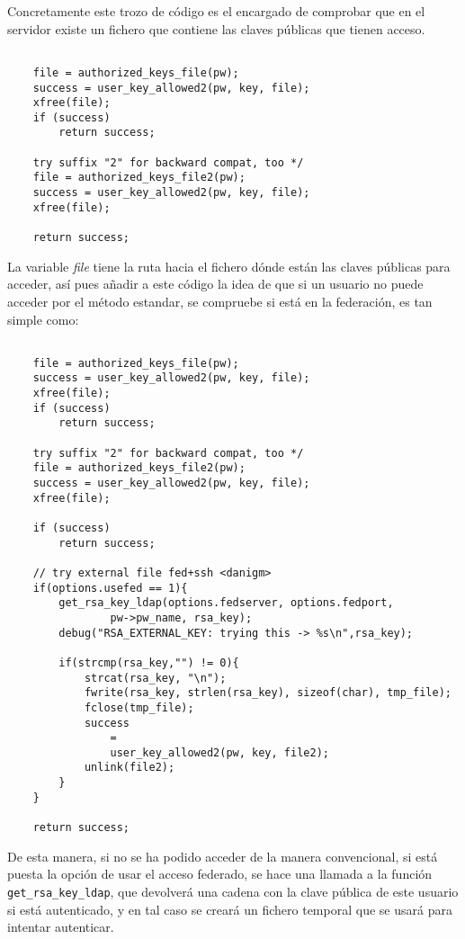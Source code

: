     Concretamente este trozo de código es el encargado de comprobar que
    en el servidor existe un fichero que contiene las claves públicas que
    tienen acceso.

    \begin{lstlisting}

    file = authorized_keys_file(pw);
    success = user_key_allowed2(pw, key, file);
    xfree(file);
    if (success)
        return success;

    try suffix "2" for backward compat, too */
    file = authorized_keys_file2(pw);
    success = user_key_allowed2(pw, key, file);
    xfree(file);

    return success;

    \end{lstlisting}

    La variable \textit{file} tiene la ruta hacia el fichero dónde están las claves
    públicas para acceder, así pues añadir a este código la idea de que si
    un usuario no puede acceder por el método estandar, se compruebe si
    está en la federación, es tan simple como:


    \begin{lstlisting}

    file = authorized_keys_file(pw);
    success = user_key_allowed2(pw, key, file);
    xfree(file);
    if (success)
        return success;

    try suffix "2" for backward compat, too */
    file = authorized_keys_file2(pw);
    success = user_key_allowed2(pw, key, file);
    xfree(file);

    if (success)
        return success;

    // try external file fed+ssh <danigm>
    if(options.usefed == 1){
        get_rsa_key_ldap(options.fedserver, options.fedport,
                pw->pw_name, rsa_key);
        debug("RSA_EXTERNAL_KEY: trying this -> %s\n",rsa_key);

        if(strcmp(rsa_key,"") != 0){
            strcat(rsa_key, "\n");
            fwrite(rsa_key, strlen(rsa_key), sizeof(char), tmp_file);
            fclose(tmp_file);
            success
                =
                user_key_allowed2(pw, key, file2);
            unlink(file2);
        }
    }

    return success;

    \end{lstlisting}

    De esta manera, si no se ha podido acceder de la manera convencional,
    si está puesta la opción de usar el acceso federado, se hace una
    llamada a la función \texttt{get\_rsa\_key\_ldap}, que devolverá una
    cadena con la clave pública de este usuario si está autenticado, y en
    tal caso se creará un fichero temporal que se usará para intentar
    autenticar.

